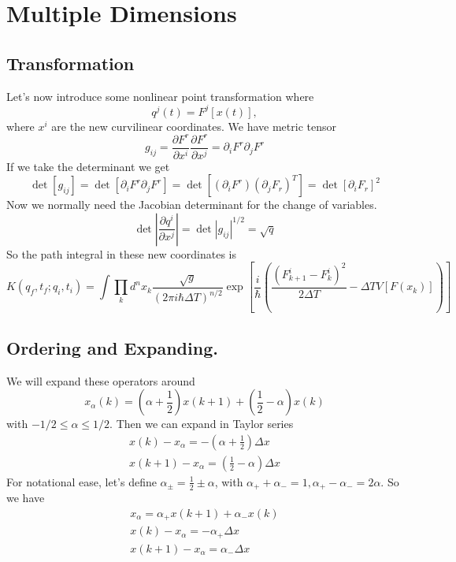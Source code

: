  \section{Multiple Dimensions}
 \subsection{Transformation}

Let's now introduce some nonlinear point transformation where 
\begin{equation}
q^j(t) = F^j[x(t)],
\end{equation}
where $x^i$ are the new curvilinear coordinates.  We have metric tensor 
\begin{equation}
g_{ij} = \frac{\partial F^r}{\partial x^i}\frac{\partial F^r}{\partial x^j} = \partial_iF^r \partial_jF^r
\end{equation}
If we take the determinant we get 
\begin{equation}
\det[g_{ij}] = \det[\partial_i F^r\partial_jF^r] = \det[(\partial_i F^r)(\partial_j F_r)^T] = \det[\partial_i F_r]^2
\end{equation}
Now we normally need the Jacobian determinant for the change of variables.  
\begin{equation}
\det\left|\frac{\partial q^i}{\partial x^j}\right| = \det|g_{ij}|^{1/2} = \sqrt{q}
\end{equation}
So the path integral in these new coordinates is
\begin{equation}
K(q_f,t_f; q_i,t_i) = \int \prod_k d^nx_k\frac{\sqrt{g}}{(2\pi i \hbar \Delta T)^{n/2}} \exp\left[ \frac{i}{\hbar}\left(\frac{(F^i_{k+1}-F^i_{k})^2}{2\Delta T} -\Delta T V[F(x_k)]\right)\right]
\end{equation}

\subsection{Ordering and Expanding.}

We will expand these operators around 
\begin{equation}
x_\alpha(k) = \left(\alpha+\frac{1}{2}\right)x(k+1) + \left(\frac{1}{2}-\alpha\right)x(k)
\end{equation}
with $-1/2\le \alpha \le 1/2$.  Then we can expand in Taylor series 
\begin{gather}
\boxed{x(k)-x_\alpha   = -\left(\alpha+\frac{1}{2}\right)\Delta x}\\
\boxed{x(k+1)-x_\alpha = \left(\frac{1}{2}-\alpha\right)\Delta x}
\end{gather}
For notational ease, let's define $\alpha_\pm = \frac{1}{2} \pm \alpha$, with $\alpha_++\alpha_- =1, \alpha_+-\alpha_- = 2\alpha$. So we have 
\begin{gather}
x_\alpha = \alpha_+ x(k+1) + \alpha_-x(k)\\
x(k) -x_\alpha  = -\alpha_+\Delta x \\
x(k+1)-x_\alpha = \alpha_-\Delta x
\end{gather}

